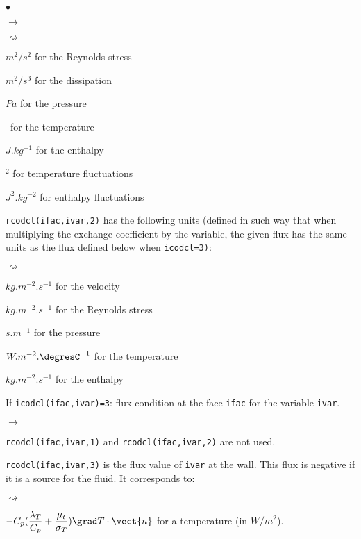 {{{\begin{list}{$\bullet$}{}
\begin{list}{$\rightarrow$}{}
\begin{list}{$\rightsquigarrow$}{}
\item $m^2/s^2$ for the Reynolds stress

\item $m^2/s^3$ for the dissipation

\item $Pa$ for the pressure

\item \degresC\ for the temperature

\item $J.kg^{-1}$ for the enthalpy

\item \degresC$^2$ for temperature fluctuations

\item $J^2.kg^{-2}$ for enthalpy fluctuations
\end{list}

\item \texttt{rcodcl(ifac,ivar,2)} has the following units (defined in such way that when multiplying the exchange coefficient by the variable, the
      given flux has the same units as the flux defined below when
      \texttt{icodcl=3)}:

\begin{list}{$\rightsquigarrow$}{}
\item $kg.m^{-2}.s^{-1}$ for the velocity

\item $kg.m^{-2}.s^{-1}$ for the Reynolds stress

\item $s.m^{-1}$ for the pressure

\item $W.m^{-2}.\mbox{\degresC}^{-1}$ for the temperature

\item $kg.m^{-2}.s^{-1}$ for the enthalpy
\end{list}

\end{list}

\item If \texttt{icodcl(ifac,ivar)=3}: flux condition at the face \texttt{ifac}
      for the variable \texttt{ivar}.

\begin{list}{$\rightarrow$}{}
\item \texttt{rcodcl(ifac,ivar,1)} and \texttt{rcodcl(ifac,ivar,2)} are not used.

\item \texttt{rcodcl(ifac,ivar,3)} is the flux value of \texttt{ivar} at the
      wall. This flux is negative if it is a source for the fluid. It corresponds to:
\begin{list}{$\rightsquigarrow$}{}
\item
$\displaystyle -C_p(\frac{\lambda_T}{C_p}+\frac{\mu_t}{\sigma_T})\grad T\cdot\vect{n}$ for a temperature (in $W/m^2$).


\end{list}
\end{list}
\end{list}}}}
